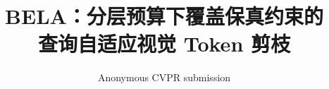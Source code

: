 \documentclass[10pt,twocolumn,letterpaper]{article}
\title{BELA：分层预算下覆盖保真约束的\\查询自适应视觉 Token 剪枝}
\author{Anonymous CVPR submission}
\begin{document}
\maketitle







{\small


}

\end{document}

